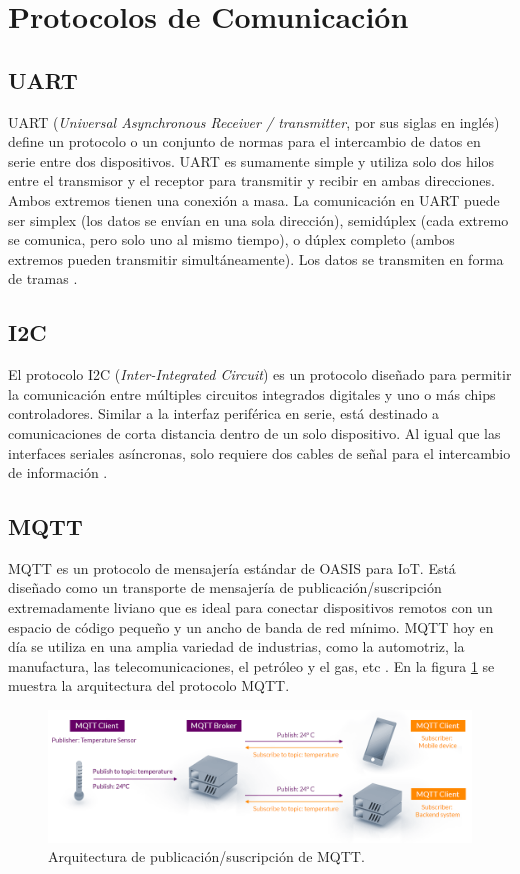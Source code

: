 \section{Protocolos de Comunicación}
\subsection{UART}
UART (\textit{Universal Asynchronous Receiver / transmitter}, por sus siglas en inglés) define un protocolo o un conjunto de normas para el intercambio de datos en serie entre dos dispositivos. UART es sumamente simple y utiliza solo dos hilos entre el transmisor y el receptor para transmitir y recibir en ambas direcciones. Ambos extremos tienen una conexión a masa. La comunicación en UART puede ser simplex (los datos se envían en una sola dirección), semidúplex (cada extremo se comunica, pero solo uno al mismo tiempo), o dúplex completo (ambos extremos pueden transmitir simultáneamente). Los datos se transmiten en forma de tramas \citep{UART}.
\subsection{I2C}

El protocolo I2C (\textit {Inter-Integrated Circuit}) es un protocolo diseñado para permitir la comunicación entre múltiples circuitos integrados digitales y uno o más chips controladores. Similar a la interfaz periférica en serie, está destinado a comunicaciones de corta distancia dentro de un solo dispositivo. Al igual que las interfaces seriales asíncronas, solo requiere dos cables de señal para el intercambio de información \citep{I2C}.

\subsection{MQTT}
MQTT es un protocolo de mensajería estándar de OASIS para IoT. Está diseñado como un transporte de mensajería de publicación/suscripción extremadamente liviano que es ideal para conectar dispositivos remotos con un espacio de código pequeño y un ancho de banda de red mínimo. MQTT hoy en día se utiliza en una amplia variedad de industrias, como la automotriz, la manufactura, las telecomunicaciones, el petróleo y el gas, etc \citep{MQTT}. En la figura \ref{fig:ArquitecturaMQTT} se muestra la arquitectura del protocolo MQTT.

\begin{figure}[htbp]
	\centering
	\includegraphics[width=1\textwidth]{./Figures/mqtt-publish-subscribe.png}
	\caption{Arquitectura de publicación/suscripción de MQTT.}
	\label{fig:ArquitecturaMQTT}
\end{figure}
